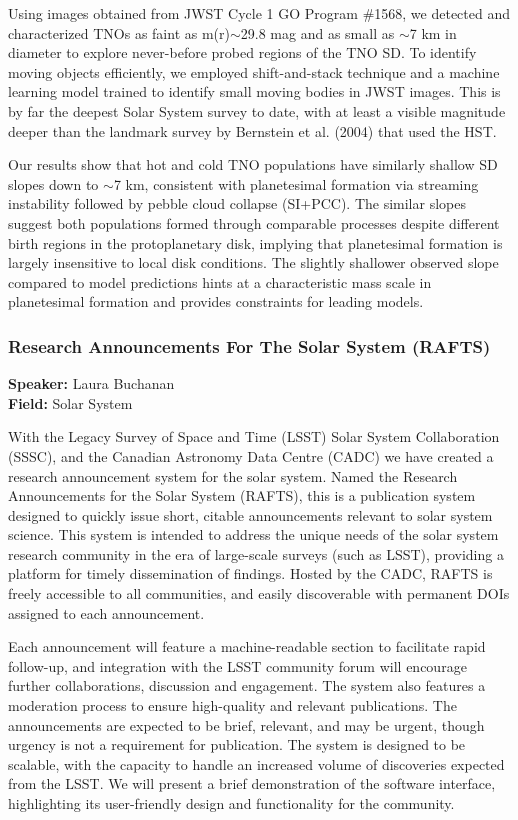 Using images obtained from JWST Cycle 1 GO Program \#1568, we detected and characterized TNOs as faint as m(r)$\sim$29.8 mag and as small as $\sim$7 km in diameter to explore never-before probed regions of the TNO SD. To identify moving objects efficiently, we employed shift-and-stack technique and a machine learning model trained to identify small moving bodies in JWST images. This is by far the deepest Solar System survey to date, with at least a visible magnitude deeper than the landmark survey by Bernstein et al. (2004) that used the HST.

Our results show that hot and cold TNO populations have similarly shallow SD slopes down to $\sim$7 km, consistent with planetesimal formation via streaming instability followed by pebble cloud collapse (SI+PCC). The similar slopes suggest both populations formed through comparable processes despite different birth regions in the protoplanetary disk, implying that planetesimal formation is largely insensitive to local disk conditions. The slightly shallower observed slope compared to model predictions hints at a characteristic mass scale in planetesimal formation and provides constraints for leading models.

\hypertarget{abstract-talk-244}{}\label{abstract-page-talk-244}
\subsubsection*{Research Announcements For The Solar System (RAFTS)}
\textbf{Speaker:} Laura Buchanan\\
\textbf{Field:} Solar System

With the Legacy Survey of Space and Time (LSST) Solar System Collaboration (SSSC), and the Canadian Astronomy Data Centre (CADC) we have created a research announcement system for the solar system. Named the Research Announcements for the Solar System (RAFTS), this is a publication system designed to quickly issue short, citable announcements relevant to solar system science. This system is intended to address the unique needs of the solar system research community in the era of large-scale surveys (such as LSST), providing a platform for timely dissemination of findings. Hosted by the CADC, RAFTS is freely accessible to all communities, and easily discoverable with permanent DOIs assigned to each announcement.

Each announcement will feature a machine-readable section to facilitate rapid follow-up, and integration with the LSST community forum will encourage further collaborations, discussion and engagement. The system also features a moderation process to ensure high-quality and relevant publications. The announcements are expected to be brief, relevant, and may be urgent, though urgency is not a requirement for publication. The system is designed to be scalable, with the capacity to handle an increased volume of discoveries expected from the LSST. We will present a brief demonstration of the software interface, highlighting its user-friendly design and functionality for the community.

